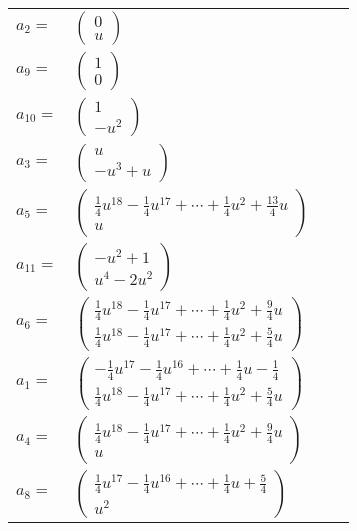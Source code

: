 \documentclass[1p]{elsarticle_modified}
\theoremstyle{definition}
\begin{document}
\begin{tabular}{m{7pt} m{180pt} m{7pt} m{180pt} }
\flushright $a_{2}=$&$\begin{pmatrix}0\\u\end{pmatrix}$ \\
\flushright $a_{9}=$&$\begin{pmatrix}1\\0\end{pmatrix}$ \\
\flushright $a_{10}=$&$\begin{pmatrix}1\\- u^2\end{pmatrix}$ \\
\flushright $a_{3}=$&$\begin{pmatrix}u\\- u^3+u\end{pmatrix}$ \\
\flushright $a_{5}=$&$\begin{pmatrix}\frac{1}{4} u^{18}-\frac{1}{4} u^{17}+\cdots+\frac{1}{4} u^2+\frac{13}{4} u\\u\end{pmatrix}$ \\
\flushright $a_{11}=$&$\begin{pmatrix}- u^2+1\\u^4-2 u^2\end{pmatrix}$ \\
\flushright $a_{6}=$&$\begin{pmatrix}\frac{1}{4} u^{18}-\frac{1}{4} u^{17}+\cdots+\frac{1}{4} u^2+\frac{9}{4} u\\\frac{1}{4} u^{18}-\frac{1}{4} u^{17}+\cdots+\frac{1}{4} u^2+\frac{5}{4} u\end{pmatrix}$ \\
\flushright $a_{1}=$&$\begin{pmatrix}-\frac{1}{4} u^{17}-\frac{1}{4} u^{16}+\cdots+\frac{1}{4} u-\frac{1}{4}\\\frac{1}{4} u^{18}-\frac{1}{4} u^{17}+\cdots+\frac{1}{4} u^2+\frac{5}{4} u\end{pmatrix}$ \\
\flushright $a_{4}=$&$\begin{pmatrix}\frac{1}{4} u^{18}-\frac{1}{4} u^{17}+\cdots+\frac{1}{4} u^2+\frac{9}{4} u\\u\end{pmatrix}$ \\
\flushright $a_{8}=$&$\begin{pmatrix}\frac{1}{4} u^{17}-\frac{1}{4} u^{16}+\cdots+\frac{1}{4} u+\frac{5}{4}\\u^2\end{pmatrix}$ \\

\end{tabular}
\end{document}
